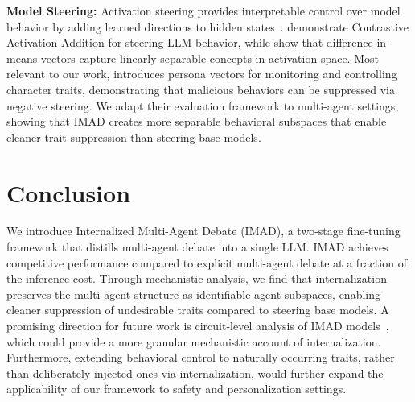 \documentclass[11pt]{article}
\begin{document}
\textbf{Model Steering:} Activation steering provides interpretable control over model behavior by adding learned directions to hidden states~\cite{subramani2022extracting, turner2023steering}. \citet{rimsky2024steering} demonstrate Contrastive Activation Addition for steering LLM behavior, while \citet{marks2023geometry} show that difference-in-means vectors capture linearly separable concepts in activation space. Most relevant to our work, \citet{chen2025persona} introduces persona vectors for monitoring and controlling character traits, demonstrating that malicious behaviors can be suppressed via negative steering. We adapt their evaluation framework to multi-agent settings, showing that IMAD creates more separable behavioral subspaces that enable cleaner trait suppression than steering base models.


\section{Conclusion}
We introduce Internalized Multi-Agent Debate (IMAD), a two-stage fine-tuning framework that distills multi-agent debate into a single LLM.
IMAD achieves competitive performance compared to explicit multi-agent debate at a fraction of the inference cost.
Through mechanistic analysis, we find that internalization preserves the multi-agent structure as identifiable agent subspaces, enabling cleaner suppression of undesirable traits compared to steering base models.
A promising direction for future work is circuit-level analysis of IMAD models~\cite{marks2023geometry, miao2025discursive}, which could provide a more granular mechanistic account of internalization. Furthermore, extending behavioral control to naturally occurring traits, rather than deliberately injected ones via internalization, would further expand the applicability of our framework to safety and personalization settings.


\end{document}
